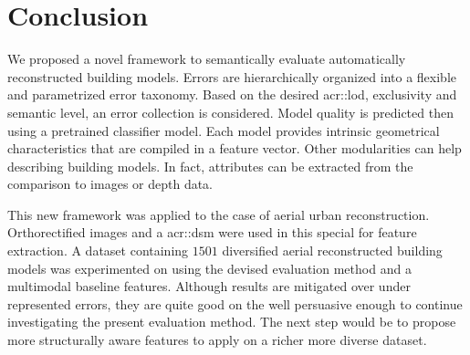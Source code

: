 \documentclass[runningheads]{llncs}
\begin{document}
\begin{figure}
\begin{center}
	\end{center}
\end{figure}

\section{Conclusion}

We proposed a novel framework to semantically evaluate automatically reconstructed building models. Errors are hierarchically organized into a flexible and parametrized error taxonomy. Based on the desired \acrshort{acr::lod}, exclusivity and semantic level, an error collection is considered. Model quality is predicted then using a pretrained classifier model. Each model provides intrinsic geometrical characteristics that are compiled in a feature vector. Other modularities can help describing building models. In fact, attributes can be extracted from the comparison to images or depth data.

This new framework was applied to the case of aerial urban reconstruction. Orthorectified images and a \acrshort{acr::dsm} were used in this special for feature extraction. A dataset containing $1501$ diversified aerial reconstructed building models was experimented on using the devised evaluation method and a multimodal baseline features. Although results are mitigated over under represented errors, they are quite good on the well  persuasive enough to continue investigating the present evaluation method. The next step would be to propose more structurally aware features to apply on a richer more diverse dataset.


\end{document}
